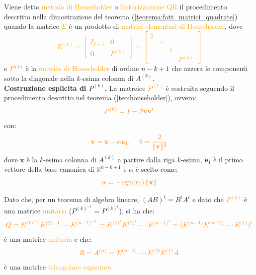 \begin{defi}
    Viene detto \textcolor{orange}{metodo di Householder} o \textcolor{orange}{fattorizzazione QR} il procedimento
    descritto nella dimostrazione del teorema (\ref{teorema:fatt_matrici_quadrate}) quando la matrice \textcolor{orange}{$E$} è un
    prodotto di \textcolor{orange}{matrici elementari di Householder}, dove
    \textcolor{orange}{\[
    E^{(k)} =
    \begin{bmatrix}
        I_{k-1} & \mathbf{0}\\
        \mathbf{0} & P^{(k)}
    \end{bmatrix} =
    \begin{bmatrix}
        1 & \\
        & \ddots \\
        & & 1 \\
        & & & P^{(k)}
    \end{bmatrix}
    \]}
    e $\textcolor{orange}{P^{(k)}}$ è la \textcolor{orange}{matrice di Householder} di ordine $n-k+1$ che azzera le componenti
    sotto la diagonale nella $k$-esima colonna di $A^{(k)}$.\\

    \textbf{Costruzione esplicita di $P^{(k)}$.}
    La matreice \textcolor{orange}{$P^{(k)}$} è costruita seguendo il procedimento descritto nel teorema (\ref{teo:householder}), ovvero:
    \[\textcolor{orange}{P^{(k)} = I - \beta \mathbf{v} \mathbf{v}^t}\]
    con:
    \[\textcolor{orange}{\mathbf{v} = \mathbf{x} - \alpha \mathbf{e}_1, \quad \beta = \frac{2}{\|\mathbf{v}\|^2}}\]
    dove $\mathbf{x}$ è la $k$-esima colonna di $A^{(k)}$ a partire dalla riga $k$-esima, $\mathbf{e}_1$ è il primo vettore della base canonica di $\mathbb{R}^{n-k+1}$ e $\alpha$ è scelto come:
    \[\textcolor{orange}{\alpha = -\,\mathrm{sgn}(x_1)\,\|\mathbf{x}\|}\]

    Dato che, per un teorema di algebra lineare, $(AB)^t = B^t A^t$ e dato che \textcolor{orange}{$P^{(k)}$} è una matrice \textcolor{orange}{unitaria} ($P^{(k)^{-1}} = P^{(k)^t}$), si ha che:
    \[\textcolor{orange}{Q = E^{(1)^{-1}} E^{(2){-1}} \cdots E^{(n-1)^{-1}} = E^{(1)^t} E^{(2)^t} \cdots E^{(n-1)^t} = (E^{(n-1)}E^{(n-2)} \cdots E^{(1)})^t}\]
    è una matrice \textcolor{orange}{unitaria} e che:
    \[\textcolor{orange}{R = A^{(n)} = E^{(n-1)} \cdots E^{(2)} E^{(1)} A}\]
    è una matrice \textcolor{orange}{triangolare superiore}.
\end{defi}

